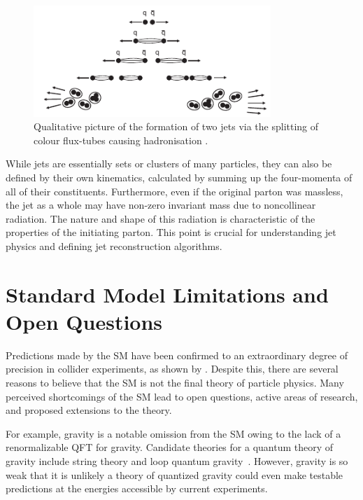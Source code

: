 \begin{figure}[h]
	\centering
	\includegraphics[width=0.8\textwidth]{Figures/standard_model/hadronisation.pdf}
	\caption{Qualitative picture of the formation of two jets via the splitting of colour flux-tubes causing hadronisation \cite{ModernParticlePhysics}.}
	\label{fig:hadronisation}
\end{figure}

While jets are essentially sets or clusters of many particles, they can also be defined by their own kinematics, calculated by summing up the four-momenta of all of their constituents.
Furthermore, even if the original parton was massless, the jet as a whole may have non-zero invariant mass due to noncollinear radiation.
The nature and shape of this radiation is characteristic of the properties of the initiating parton.
This point is crucial for understanding jet physics and defining jet reconstruction algorithms.

\section{Standard Model Limitations and Open Questions}
\label{sec:sm_limitations}

Predictions made by the SM have been confirmed to an extraordinary degree of precision in collider experiments, as shown by .
Despite this, there are several reasons to believe that the SM is not the final theory of particle physics.
Many perceived shortcomings of the SM lead to open questions, active areas of research, and proposed extensions to the theory.

For example, gravity is a notable omission from the SM owing to the lack of a renormalizable QFT for gravity.
Candidate theories for a quantum theory of gravity include string theory and loop quantum gravity~\cite{GravityQFT}.
However, gravity is so weak that it is unlikely a theory of quantized gravity could even make testable predictions at the energies accessible by current experiments.


